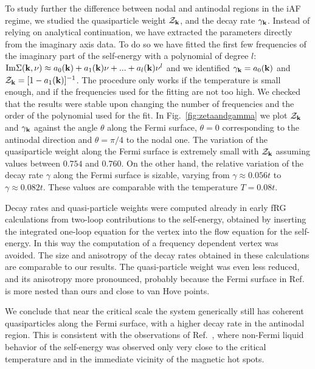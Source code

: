To study further the difference between nodal and antinodal regions in the iAF regime, we studied the quasiparticle weight \cite{Abrikosov1963} $\mathcal{Z}_{\mathbf{k}}$, and the decay rate $\gamma_{\mathbf{k}}$.
Instead of relying on analytical continuation, we have extracted the parameters directly from the imaginary axis data.
To do so we have fitted the first few frequencies of the imaginary part of the self-energy with a polynomial of degree $l$: $\mathrm{Im}\Sigma(\mathbf{k},\nu) \approx a_0(\mathbf{k})+a_1(\mathbf{k})\nu+...+a_l(\mathbf{k})\nu^l$ and we identified $\gamma_{\mathbf{k}}=a_0(\mathbf{k})$ and $\mathcal{Z}_{\mathbf{k}}= [1-a_1(\mathbf{k})]^{-1}$.
The procedure only works if the temperature is small enough, and if the frequencies used for the fitting are not too high. We checked that the results were stable upon changing the number of frequencies and the order of the polynomial used for the fit. 
In Fig.~\ref{fig:zetaandgamma} we plot $\mathcal{Z}_{\mathbf{k}}$ and $\gamma_{\mathbf{k}}$ against the angle $\theta$ along the Fermi surface, $\theta=0$ corresponding to the antinodal direction and $\theta=\pi/4$ to the nodal one. 
The variation of the quasiparticle weight along the Fermi surface is extremely small with $\mathcal{Z}_{\mathbf{k}}$ assuming values between $0.754$ and $0.760$. 
On the other hand, the relative variation of the decay rate $\gamma$ along the Fermi surface is sizable, varying from $\gamma\approx 0.056t$ to $\gamma \approx 0.082t$. These values are comparable with the temperature $T=0.08t$.

Decay rates \cite{Honerkamp2001a} and quasi-particle weights \cite{Honerkamp2003} were computed already in early fRG calculations from two-loop contributions to the self-energy, obtained by inserting the integrated one-loop equation for the vertex into the flow equation for the self-energy. In this way the computation of a frequency dependent vertex was avoided.
The size and anisotropy of the decay rates obtained in these calculations are comparable to our results. The quasi-particle weight was even less reduced, and its anisotropy more pronounced, probably because the Fermi surface in Ref.~ is more nested than ours and close to van Hove points. 

We conclude that near the critical scale the system generically still has coherent quasiparticles along the Fermi surface, with a higher decay rate in the antinodal region. This is consistent with the observations of Ref.~, where non-Fermi liquid behavior of the self-energy was observed only very close to the critical temperature and in the immediate vicinity of the magnetic hot spots.
